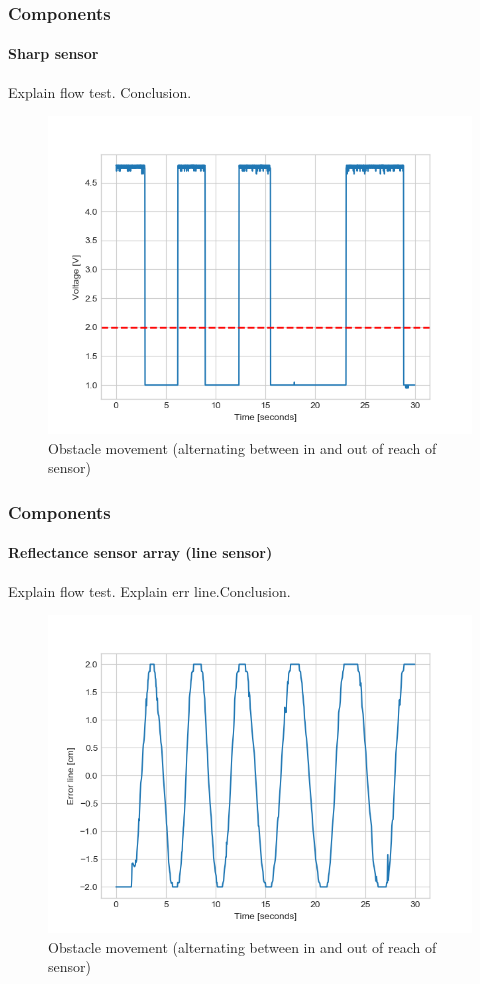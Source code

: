 \documentclass{beamer}
\begin{document}
\begin{frame}
\frametitle{Components}
\framesubtitle{Sharp sensor}
Explain flow test. Conclusion.
\begin{figure}[hbtp]
\centering
\includegraphics[scale=0.4]{figures/sharp-flow.png}
\caption{Obstacle movement (alternating between in and out of reach of sensor)}
\end{figure}
\end{frame}



\begin{frame}
\frametitle{Components}
\framesubtitle{Reflectance sensor array (line sensor)}
Explain flow test. Explain err line.Conclusion.
\begin{figure}[hbtp]
\centering
\includegraphics[scale=0.4]{figures/qtr-flow.png}
\caption{Obstacle movement (alternating between in and out of reach of sensor)}
\end{figure}
\end{frame}
\end{document}
